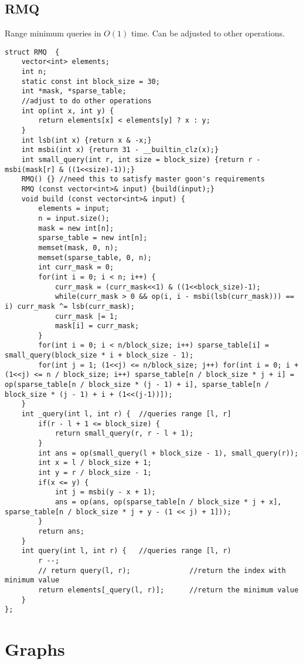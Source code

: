 \documentclass[8pt, headheight=10pt, a4paper]{article}
\begin{document}
\begin{multicols*}{3}
\subsection{RMQ}
Range minimum queries in $O(1)$ time. Can be adjusted to other operations. 
\begin{lstlisting}
struct RMQ  {
    vector<int> elements;
    int n;
    static const int block_size = 30;
    int *mask, *sparse_table;
    //adjust to do other operations
    int op(int x, int y) { 
        return elements[x] < elements[y] ? x : y;
    }
    int lsb(int x) {return x & -x;}
    int msbi(int x) {return 31 - __builtin_clz(x);}
    int small_query(int r, int size = block_size) {return r - msbi(mask[r] & ((1<<size)-1));}
    RMQ() {} //need this to satisfy master goon's requirements
    RMQ (const vector<int>& input) {build(input);}
    void build (const vector<int>& input) {
        elements = input;
        n = input.size();
        mask = new int[n];
        sparse_table = new int[n];
        memset(mask, 0, n);
        memset(sparse_table, 0, n);
        int curr_mask = 0;
        for(int i = 0; i < n; i++) {
            curr_mask = (curr_mask<<1) & ((1<<block_size)-1);
            while(curr_mask > 0 && op(i, i - msbi(lsb(curr_mask))) == i) curr_mask ^= lsb(curr_mask);
            curr_mask |= 1;
            mask[i] = curr_mask;
        }
        for(int i = 0; i < n/block_size; i++) sparse_table[i] = small_query(block_size * i + block_size - 1);
        for(int j = 1; (1<<j) <= n/block_size; j++) for(int i = 0; i + (1<<j) <= n / block_size; i++) sparse_table[n / block_size * j + i] = op(sparse_table[n / block_size * (j - 1) + i], sparse_table[n / block_size * (j - 1) + i + (1<<(j-1))]);
    }
    int _query(int l, int r) {  //queries range [l, r]
        if(r - l + 1 <= block_size) {
            return small_query(r, r - l + 1);
        }
        int ans = op(small_query(l + block_size - 1), small_query(r)); 
        int x = l / block_size + 1;
        int y = r / block_size - 1;
        if(x <= y) {
            int j = msbi(y - x + 1);
            ans = op(ans, op(sparse_table[n / block_size * j + x], sparse_table[n / block_size * j + y - (1 << j) + 1]));
        }
        return ans;
    }
    int query(int l, int r) {   //queries range [l, r)
        r --;
        // return query(l, r);              //return the index with minimum value
        return elements[_query(l, r)];      //return the minimum value
    }
};
\end{lstlisting}

\section{Graphs}

\end{multicols*}
\end{document}
